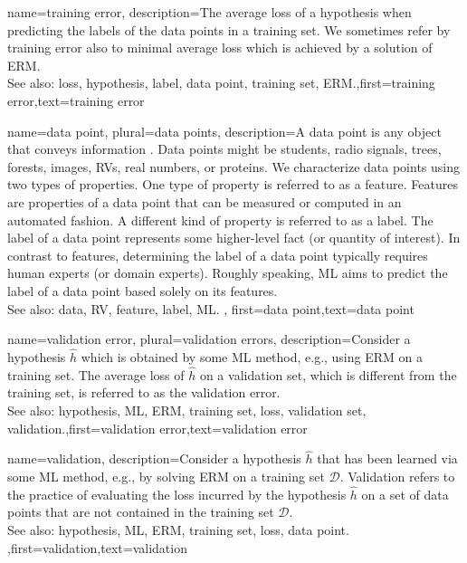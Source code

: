 {
	name={training error},
	description={The average loss of a hypothesis when 
		predicting the labels of the data points in a training set. 
		We sometimes refer by training error also to minimal average loss 
		which is achieved by a solution of ERM.
				\\
		See also: loss, hypothesis, label, data point, training set, ERM.},first={training error},text={training error}  
}

{name={data point}, plural={data points},
description={A data point is any object that conveys information \cite{coverthomas}. Data points might be 
		students, radio signals, trees, forests, images, RVs, real numbers, or proteins. We characterize data points 
		using two types of properties. One type of property is referred to as a feature. Features are properties of a 
		data point that can be measured or computed in an automated fashion. 
		A different kind of property is referred to as a label. The label of 
		a data point represents some higher-level fact (or quantity of interest). In 
		contrast to features, determining the label of a data point typically 
		requires human experts (or domain experts). Roughly speaking, ML aims to predict 
		the label of a data point based solely on its features. 
				\\
		See also: data, RV, feature, label, ML.
		}, first={data point},text={data point}  
}


{name={validation error}, plural={validation errors},
 description={Consider a hypothesis $\hat{h}$ which is 
 	obtained by some ML method, e.g., using ERM on a training set. The average loss 
 	of $\hat{h}$ on a validation set, which is different from the training set, is referred 
 	to as the validation error.
			\\
		See also: hypothesis, ML, ERM, training set, loss, validation set, validation.},first={validation error},text={validation error}  
}

{name={validation},
	description={Consider a hypothesis $\hat{h}$ that has been 
		learned via some ML method, e.g., by solving ERM on a training set $\mathcal{D}$. 
		Validation refers to the practice of evaluating the loss incurred by the 
		hypothesis $\hat{h}$ on a set of 
		data points that are not contained in the training set $\mathcal{D}$.
				\\
		See also: hypothesis, ML, ERM, training set, loss, data point. },first={validation},text={validation}  
}

